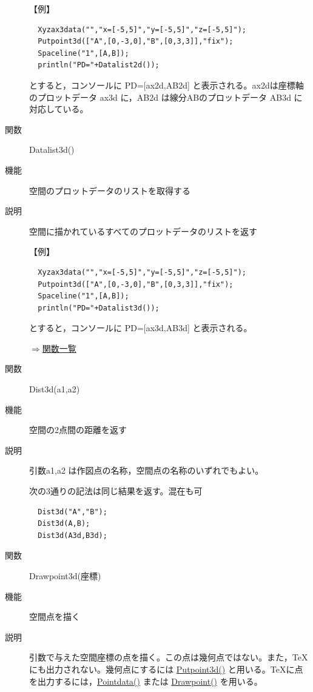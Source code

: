 \documentclass[papersize,a4paper,12pt,uplatex]{jsarticle}
\begin{document}
\begin{description}
\vspace{\baselineskip}
【例】
\begin{verbatim}
  Xyzax3data("","x=[-5,5]","y=[-5,5]","z=[-5,5]");
  Putpoint3d(["A",[0,-3,0],"B",[0,3,3]],"fix");
  Spaceline("1",[A,B]);
  println("PD="+Datalist2d());
\end{verbatim}
とすると，コンソールに  PD=[ax2d,AB2d]   と表示される。ax2dは座標軸のプロットデータ ax3d に，AB2d は線分ABのプロットデータ AB3d に対応している。

\vspace{\baselineskip}
\hypertarget{datalist}{}
\item[関数]  Datalist3d()
\item[機能]  空間のプロットデータのリストを取得する
\item[説明]  空間に描かれているすべてのプロットデータのリストを返す

\vspace{\baselineskip}
【例】
\begin{verbatim}
  Xyzax3data("","x=[-5,5]","y=[-5,5]","z=[-5,5]");
  Putpoint3d(["A",[0,-3,0],"B",[0,3,3]],"fix");
  Spaceline("1",[A,B]);
  println("PD="+Datalist3d());
\end{verbatim}
とすると，コンソールに  PD=[ax3d,AB3d]   と表示される。


\begin{flushright} \hyperlink{functionlist}{$\Rightarrow$関数一覧}\end{flushright}

\hypertarget{dist3d}{}
\item[関数]  Dist3d(a1,a2)
\item[機能]  空間の2点間の距離を返す
\item[説明]  引数a1,a2 は作図点の名称，空間点の名称のいずれでもよい。

次の3通りの記法は同じ結果を返す。混在も可
\begin{verbatim}
  Dist3d("A","B");
  Dist3d(A,B);
  Dist3d(A3d,B3d);
\end{verbatim}
\vspace{\baselineskip}

\hypertarget{drawpoint3d}{}
\item[関数]  Drawpoint3d(座標)
\item[機能]  空間点を描く
\item[説明]  引数で与えた空間座標の点を描く。この点は幾何点ではない。また，TeX にも出力されない。幾何点にするには \hyperlink{putpoint3d}{Putpoint3d()} と用いる。TeXに点を出力するには，\hyperlink{pointdata}{Pointdata()} または \hyperlink{drwpt}{Drawpoint()} を用いる。


\end{description}
\end{document}
